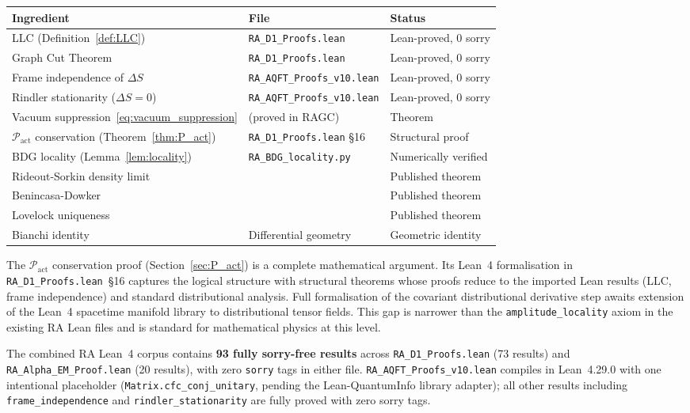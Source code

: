 \documentclass[11pt,a4paper]{article}
\newcommand{\Pact}{\mathcal{P}_{\mathrm{act}}}
\newcommand{\dS}{\Delta S}
\begin{document}
\begin{center}
\renewcommand{\arraystretch}{1.25}
\begin{tabular}{lll}
\toprule
Ingredient & File & Status \\
\midrule
LLC (Definition~\ref{def:LLC}) & \texttt{RA\_D1\_Proofs.lean} & Lean-proved, 0 sorry \\
Graph Cut Theorem & \texttt{RA\_D1\_Proofs.lean} & Lean-proved, 0 sorry \\
Frame independence of $\dS$ & \texttt{RA\_AQFT\_Proofs\_v10.lean} & Lean-proved, 0 sorry \\
Rindler stationarity ($\Delta S=0$) & \texttt{RA\_AQFT\_Proofs\_v10.lean} & Lean-proved, 0 sorry \\
Vacuum suppression~\eqref{eq:vacuum_suppression} & (proved in RAGC) & Theorem \\
$\Pact$ conservation (Theorem~\ref{thm:P_act}) & \texttt{RA\_D1\_Proofs.lean} §16 & Structural proof \\
BDG locality (Lemma~\ref{lem:locality}) & \texttt{RA\_BDG\_locality.py} & Numerically verified \\
Rideout-Sorkin density limit & \citep{RideoutSorkin2000} & Published theorem \\
Benincasa-Dowker & \citep{Benincasa2010} & Published theorem \\
Lovelock uniqueness & \citep{Lovelock1971} & Published theorem \\
Bianchi identity & Differential geometry & Geometric identity \\
\bottomrule
\end{tabular}
\end{center}

\noindent
The $\Pact$ conservation proof (Section~\ref{sec:P_act}) is a
complete mathematical argument. Its Lean~4 formalisation in
\texttt{RA\_D1\_Proofs.lean}~§16 captures the logical structure with
structural theorems whose proofs reduce to the imported Lean results
(LLC, frame independence) and standard distributional analysis. Full
formalisation of the covariant distributional derivative step awaits
extension of the Lean~4 spacetime manifold library to distributional
tensor fields. This gap is narrower than the \texttt{amplitude\_locality}
axiom in the existing RA Lean files and is standard for mathematical
physics at this level.

The combined RA Lean~4 corpus contains \textbf{93 fully sorry-free results}
across \texttt{RA\_D1\_Proofs.lean} (73 results) and
\texttt{RA\_Alpha\_EM\_Proof.lean} (20 results), with zero \texttt{sorry}
tags in either file.
\texttt{RA\_AQFT\_Proofs\_v10.lean} compiles in Lean~4.29.0 with one
intentional placeholder (\texttt{Matrix.cfc\_conj\_unitary}, pending the
Lean-QuantumInfo library adapter); all other results including
\texttt{frame\_independence} and \texttt{rindler\_stationarity}
are fully proved with zero sorry tags.
\end{document}
